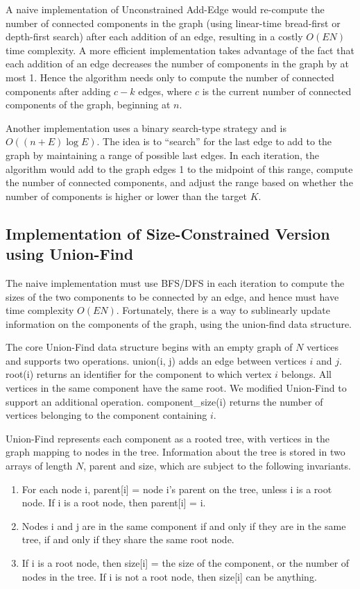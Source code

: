 A naive implementation of Unconstrained Add-Edge would re-compute the
number of connected components in the graph (using linear-time
bread-first or depth-first search) after each addition of an edge,
resulting in a costly $O(EN)$ time complexity. A more efficient
implementation takes advantage of the fact that each addition of an
edge decreases the number of components in the graph by at most 1.
Hence the algorithm needs only to compute the number of connected
components after adding $c - k$ edges, where $c$ is the current number
of connected components of the graph, beginning at $n$.

Another implementation uses a binary search-type strategy and is
$O((n + E) \log E)$. The idea is to ``search'' for the last edge to add
to the graph by maintaining a range of possible last edges. In each
iteration, the algorithm would add to the graph edges 1 to the midpoint
of this range, compute the number of connected components, and adjust
the range based on whether the number of components is higher or lower
than the target $K$.

\subsection{Implementation of Size-Constrained Version using Union-Find}

The naive implementation must use BFS/DFS in each iteration to compute
the sizes of the two components to be connected by an edge, and hence
must have time complexity $O(EN)$. Fortunately, there is a way to
sublinearly update information on the components of the graph, using
the union-find data structure.

The core Union-Find data structure begins with an empty graph of $N$
vertices and supports two operations. union(i, j) adds an edge between
vertices $i$ and $j$. root(i) returns an identifier for the component
to which vertex $i$ belongs. All vertices in the same component have the
same root. We modified Union-Find to support an additional operation.
component\_size(i) returns the number of vertices belonging to the
component containing $i$.

Union-Find represents each component as a rooted tree, with vertices in
the graph mapping to nodes in the tree. Information about the tree is
stored in two arrays of length $N$, parent and size, which are subject
to the following invariants.

\begin{enumerate}[1.]
\item
For each node i, parent[i] = node i's parent on the tree, unless i is a
root node. If i is a root node, then parent[i] = i.

\item
Nodes i and j are in the same component if and only if they are in the
same tree, if and only if they share the same root node.

\item
If i is a root node, then size[i] = the size of the component, or the
number of nodes in the tree. If i is not a root node, then size[i] can
be anything.
\end{enumerate}

